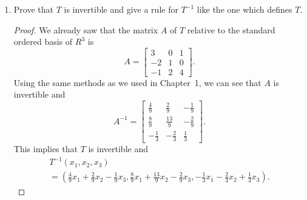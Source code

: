 \begin{enumerate}
\item Prove that $T$ is invertible and give a rule for $T^{-1}$ like
  the one which defines $T$.
  \begin{proof}
    We already saw that the matrix $A$ of $T$ relative to the standard
    ordered basis of $R^3$ is
    \begin{equation*}
      A =
      \begin{bmatrix}
        3 & 0 & 1 \\
        -2 & 1 & 0 \\
        -1 & 2 & 4
      \end{bmatrix}.
    \end{equation*}
    Using the same methods as we used in Chapter~1, we can see that
    $A$ is invertible and
    \begin{equation*}
      A^{-1} =
      \begin{bmatrix}
        \frac49 & \frac29 & -\frac19 \\[3pt]
        \frac89 & \frac{13}9 & -\frac29 \\[3pt]
        -\frac13 & -\frac23 & \frac13
      \end{bmatrix}.
    \end{equation*}
    This implies that $T$ is invertible and
    \begin{multline*}
      T^{-1}(x_1,x_2,x_3) \\
      = \left(
        \frac49x_1 + \frac29x_2 - \frac19x_3,
        \frac89x_1 + \frac{13}9x_2 - \frac29x_3,
        -\frac13x_1 - \frac23x_2 + \frac13x_3
      \right).
    \end{multline*}
  \end{proof}
\end{enumerate}

